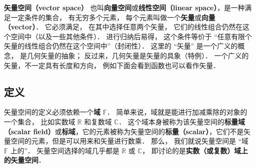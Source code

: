 

\textbf{矢量空间（vector space）} 也叫\textbf{向量空间}或\textbf{线性空间（linear space）}，是一种满足一定条件的集合， 有无穷多个元素， 每个元素叫做一个\textbf{矢量}或\textbf{向量（vector）}． 它必须满足， 在其中选择任意两个矢量， 它们的线性组合仍然在这个空间中（以及一些其他条件）． 进行归纳后易得， 这个条件等价于 “任意有限个矢量的线性组合仍然在这个空间中”（封闭性）． 这里的 “矢量” 是一个广义的概念， 是几何矢量的抽象； 反过来，几何矢量是矢量的具象（特例）． 一个广义的矢量，不一定具有长度和方向， 例如下面会看到函数也可以看作矢量．

\subsection{定义}
矢量空间的定义必须依赖一个\textbf{域} $\mathbb F$． 简单来说，域就是能进行加减乘除的对象的一个集合， 比如实数域 $\mathbb R$ 和复数域 $\mathbb C$． 这个域本身被称为该矢量空间的\textbf{标量域（scalar field）}或\textbf{标域}，它的元素被称为矢量空间的\textbf{标量（scalar）}，它们不是矢量空间的元素，但是可以用来和矢量进行数乘． 那么， 我们就说矢量空间是 “域 $\mathbb{F}$ 上的”． 矢量空间选择的域几乎都是 $\mathbb{R}$ 或 $\mathbb{C}$， 即讨论的是\textbf{实数（或复数）域上的矢量空间}．


